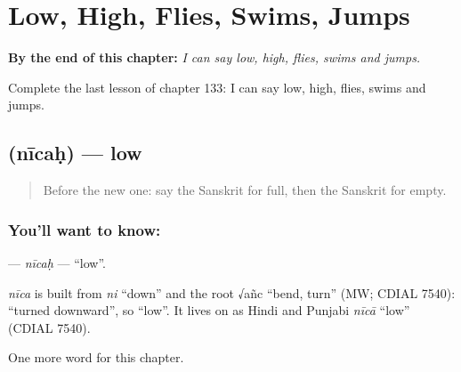 
\chapter{Low, High, Flies, Swims, Jumps}
\label{ch:sa-low-high-flies-swims-jumps}

\begin{chapteropening}
\textbf{By the end of this chapter:} \emph{I can say low, high, flies, swims and jumps.}

Complete the last lesson of chapter 133: I can say low, high, flies, swims and jumps.
\end{chapteropening}

\section[\texorpdfstring{\sk{नीचः} (nīcaḥ)}{नीचः (nīcaḥ)}]{ (nīcaḥ) — low}

\label{lesson:SA-C133-nicah}



\begin{quote}
Before the new one: say the Sanskrit for full, then the Sanskrit for empty.
\end{quote}

\subsection*{You'll want to know: }
\textbf{} — \emph{nīcaḥ} — \textquotedblleft{}low\textquotedblright{}.

\begin{cousinweb}
\emph{nīca} is built from \emph{ni} \textquotedblleft{}down\textquotedblright{} and the root √añc \textquotedblleft{}bend, turn\textquotedblright{} (MW; CDIAL 7540): \textquotedblleft{}turned downward\textquotedblright{}, so \textquotedblleft{}low\textquotedblright{}. It lives on as Hindi and Punjabi \emph{nīcā} \textquotedblleft{}low\textquotedblright{} (CDIAL 7540).
\end{cousinweb}

\begin{grammarlens}[title={What you've built}]
One more word for this chapter.
\end{grammarlens}

